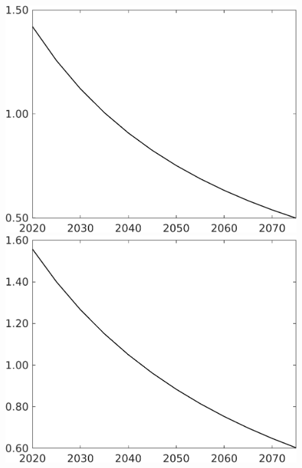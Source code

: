 \begin{figure}[h!!]
\begin{minipage}[]{0.32\textwidth}
	\end{minipage}		
	\begin{minipage}[]{0.32\textwidth}
		\includegraphics[width=1\textwidth]{../../codding_model/own_basedOnFried/optimalPol_010922_revision/figures/all_13Sept22/CompTaul_LFBAUPer_Reg0_sg_spillover0_nsk1_xgr0_sep1_countec0_GovRev1_etaa0.79.png}
	\end{minipage}	
	\begin{minipage}[]{0.32\textwidth}
		\includegraphics[width=1\textwidth]{../../codding_model/own_basedOnFried/optimalPol_010922_revision/figures/all_13Sept22/CompTaul_LFBAUPer_Reg0_sn_spillover0_nsk1_xgr0_sep1_countec0_GovRev1_etaa0.79.png}

\end{minipage}
\end{figure}
